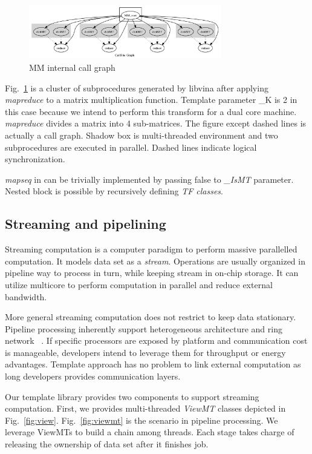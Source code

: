 \documentclass[10pt, conference, compsocconf]{IEEEtran}
\begin{document}
\begin{figure}
\centering
\includegraphics[width=3.3in]{test_matrix}
\caption{MM internal call graph}\label{fig:mm}
\end{figure}

Fig.~\ref{fig:mm} is a cluster of subprocedures generated by libvina
after applying \emph{mapreduce} to a matrix multiplication
function. Template parameter \_K is 2 in this case because we intend
to perform this transform for a dual core machine. \emph{mapreduce}
divides a matrix into 4 sub-matrices. The figure except dashed lines
is actually a call graph. Shadow box is multi-threaded environment and two subprocedures are executed in parallel. Dashed lines indicate logical synchronization. 

\emph{mapseq} in \cite{b1} can be trivially implemented by passing false to \emph{\_IsMT} parameter. Nested block is possible by recursively defining \emph{TF classes}.

\subsection{Streaming and pipelining}
Streaming computation is a computer paradigm to perform massive parallelled computation. It models data set as a \emph{stream}. Operations are usually organized in pipeline way to process in turn, while keeping stream in on-chip storage. It can utilize multicore to perform computation in parallel and reduce external bandwidth. 

More general streaming computation does not restrict to keep data
stationary. Pipeline processing inherently support heterogeneous
architecture and ring network ~\cite{b19,b14}. If specific processors
are exposed by platform and communication cost is manageable, developers
intend to leverage  them for throughput or energy advantages. Template approach has no problem to link external computation as long developers provides communication layers.

Our template library provides two components to support streaming
computation. First, we provides multi-threaded \emph{ViewMT}
classes depicted in Fig.~\ref{fig:view}. Fig.~\ref{fig:viewmt}  is the
scenario in pipeline processing. We leverage ViewMTs to build a chain
among threads. Each stage takes charge of releasing the ownership of
data set after it finishes job.
\end{document}
